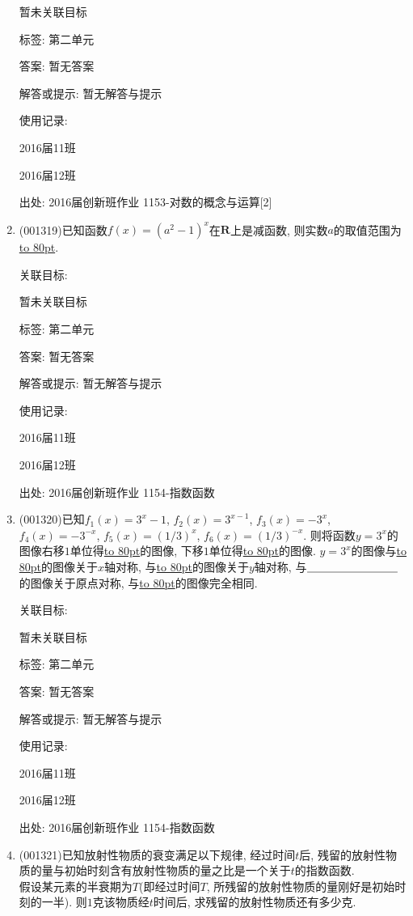 \documentclass[10pt,a4paper]{article}
\newcommand{\blank}[1]{\underline{\hbox to #1pt{}}}
\begin{document}
\begin{enumerate}[1.]
暂未关联目标



标签: 第二单元

答案: 暂无答案

解答或提示: 暂无解答与提示

使用记录:

2016届11班	

2016届12班	


出处: 2016届创新班作业	1153-对数的概念与运算[2]
\item { (001319)}已知函数$f(x)=(a^2-1)^x$在$\mathbf{R}$上是减函数, 则实数$a$的取值范围为\blank{80}.


关联目标:

暂未关联目标



标签: 第二单元

答案: 暂无答案

解答或提示: 暂无解答与提示

使用记录:

2016届11班	

2016届12班	


出处: 2016届创新班作业	1154-指数函数
\item { (001320)}已知$f_1(x)=3^x-1$, $f_2(x)=3^{x-1}$, $f_3(x)=-3^x$, $f_4(x)=-3^{-x}$, $f_5(x)=(1/3)^x$, $f_6(x)=(1/3)^{-x}$. 则将函数$y=3^x$的图像右移$1$单位得\blank{80}的图像, 下移$1$单位得\blank{80}的图像. $y=3^x$的图像与\blank{80}的图像关于$x$轴对称, 与\blank{80}的图像关于$y$轴对称, 与$\blank{80}$的图像关于原点对称, 与\blank{80}的图像完全相同.


关联目标:

暂未关联目标



标签: 第二单元

答案: 暂无答案

解答或提示: 暂无解答与提示

使用记录:

2016届11班	

2016届12班	


出处: 2016届创新班作业	1154-指数函数
\item { (001321)}已知放射性物质的衰变满足以下规律, 经过时间$t$后, 残留的放射性物质的量与初始时刻含有放射性物质的量之比是一个关于$t$的指数函数.\\ 
假设某元素的半衰期为$T$(即经过时间$T$, 所残留的放射性物质的量刚好是初始时刻的一半). 则$1$克该物质经$t$时间后, 求残留的放射性物质还有多少克.



\end{enumerate}
\end{document}
